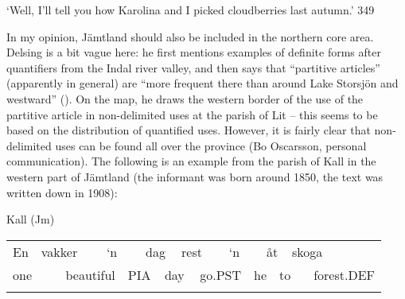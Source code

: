 \begin{styleTranslation}
‘Well, I’ll tell you how Karolina and I picked cloudberries last autumn.’\textsuperscript{ }349

\end{styleTranslation}

\begin{styleBodyTextFirst}
In my opinion, Jämtland should also be included in the northern core area. Delsing is a bit vague here: he first mentions examples of definite forms after quantifiers from the Indal river valley, and then says that “partitive articles” (apparently in general) are “more frequent there than around Lake Storsjön and westward” (\citet[19]{Delsing2003a}). On the map, he draws the western border of the use of the partitive article in non-delimited uses at the parish of Lit – this seems to be based on the distribution of quantified uses. However, it is fairly clear that non-delimited uses can be found all over the province (Bo Oscarsson, personal communication). The following is an example from the parish of Kall in the western part of Jämtland (the informant was born around 1850, the text was written down in 1908):

\end{styleBodyTextFirst}

\begin{listWWNumileveli}
\item {}

\begin{styleExample}
Kall (Jm)

\end{styleExample}

\end{listWWNumileveli}

\begin{tabular}{llllllllllllllll}
\lsptoprule
En & \multicolumn{2}{l}{vakker

} & \multicolumn{2}{l}{‘n

} & \multicolumn{2}{l}{dag

} & \multicolumn{2}{l}{rest

} & \multicolumn{2}{l}{‘n

} & \multicolumn{2}{l}{åt

} & \multicolumn{2}{l}{skoga

} & \\
\multicolumn{2}{l}{one

} & \multicolumn{2}{l}{beautiful

} & \multicolumn{2}{l}{PIA

} & \multicolumn{2}{l}{day

} & \multicolumn{2}{l}{go.PST

} & \multicolumn{2}{l}{he

} & \multicolumn{2}{l}{to

} & \multicolumn{2}{l}{forest.DEF

}\\
\lspbottomrule
\end{tabular}

